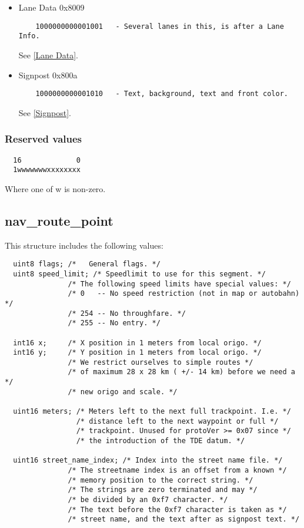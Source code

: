 \documentclass[a4paper]{article}
\begin{document}
\begin{itemize}
\item Lane Data 0x8009
    \begin{verbatim}
    1000000000001001   - Several lanes in this, is after a Lane Info.
    \end{verbatim}
    See \ref{Lane Data}.

\item Signpost 0x800a
    \begin{verbatim}
    1000000000001010   - Text, background, text and front color.
    \end{verbatim}
    See \ref{Signpost}.
 
\end{itemize}

\subsubsection{Reserved values}

\begin{verbatim}
  16             0
  1wwwwwwwxxxxxxxx
\end{verbatim}

Where one of w is non-zero.

\subsection{nav\_route\_point}

This structure includes the following values:

\begin{verbatim}
  uint8 flags; /*   General flags. */
  uint8 speed_limit; /* Speedlimit to use for this segment. */
               /* The following speed limits have special values: */
               /* 0   -- No speed restriction (not in map or autobahn) */
               /* 254 -- No throughfare. */
               /* 255 -- No entry. */

  int16 x;     /* X position in 1 meters from local origo. */
  int16 y;     /* Y position in 1 meters from local origo. */
               /* We restrict ourselves to simple routes */
               /* of maximum 28 x 28 km ( +/- 14 km) before we need a */
               /* new origo and scale. */

  uint16 meters; /* Meters left to the next full trackpoint. I.e. */
                 /* distance left to the next waypoint or full */
                 /* trackpoint. Unused for protoVer >= 0x07 since */
                 /* the introduction of the TDE datum. */

  uint16 street_name_index; /* Index into the street name file. */
               /* The streetname index is an offset from a known */
               /* memory position to the correct string. */
               /* The strings are zero terminated and may */
               /* be divided by an 0xf7 character. */
               /* The text before the 0xf7 character is taken as */
               /* street name, and the text after as signpost text. */
\end{verbatim}
\end{document}
